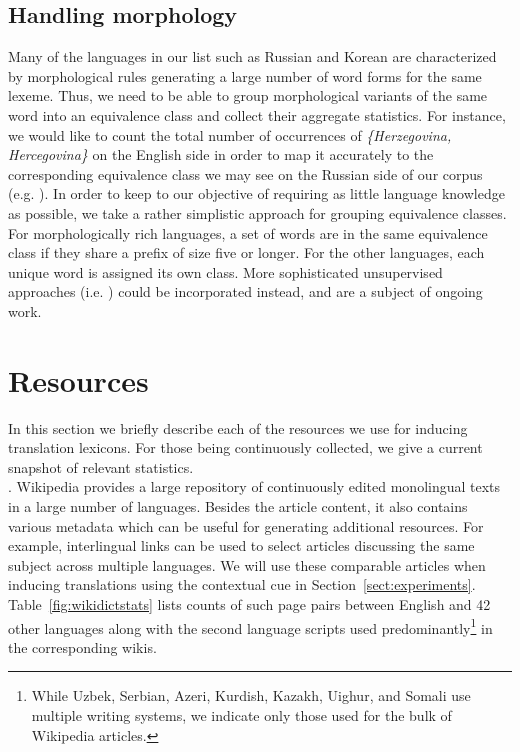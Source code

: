 \documentclass{article}
\newcommand{\secref}[1]{Section~\ref{#1}}
\newcommand{\tabref}[1]{Table~\ref{#1}}
\begin{document}
\subsection{Handling morphology} \label{sect:morph}

Many of the languages in our list such as Russian and Korean are characterized by morphological rules generating a large number of word forms for the same lexeme.  Thus, we need to be able to group morphological variants of the same word into an equivalence class and collect their aggregate statistics.  For instance, we would like to count the total number of occurrences of \emph{\{Herzegovina, Hercegovina\}} on the English side in order to map it accurately to the corresponding equivalence class we may see on the Russian side of our corpus (e.g. ).  In order to keep to our objective of requiring as little language knowledge as possible, we take a rather simplistic approach for grouping equivalence classes.  For morphologically rich languages, a set of words are in the same equivalence class if they share a prefix of size five or longer.  For the other languages, each unique word is assigned its own class.  More sophisticated unsupervised approaches (i.e. \cite{Snyder:2008, Poon:2009a}) could be incorporated instead, and are a subject of ongoing work.\\

\section{Resources} \label{sect:resources}

In this section we briefly describe each of the resources we use for inducing translation lexicons.  For those being continuously collected, we give a current snapshot of relevant statistics.\\

. Wikipedia provides a large repository of continuously edited monolingual texts in a large number of languages.  Besides the article content, it also contains various metadata which can be useful for generating additional resources.  For example,
interlingual links can be used to select articles discussing the same subject across multiple languages.  We will use these comparable articles when inducing translations using the contextual cue in \secref{sect:experiments}.  \tabref{fig:wikidictstats} lists counts of such page pairs between English and 42 other languages along with the second language scripts used predominantly\footnote{While Uzbek, Serbian, Azeri, Kurdish, Kazakh, Uighur, and Somali use multiple writing systems, we indicate only those used for the bulk of Wikipedia articles.} in the corresponding wikis.\\
 
\end{document}
